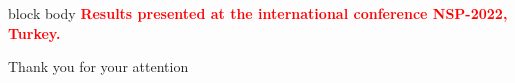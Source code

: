 \documentclass{beamer}
\begin{document}
\begin{frame}
\begin{figure}
	\end{figure}
	\vspace{-0.2cm}
	\begin{beamercolorbox}[rounded=true,shadow=false, wd=\linewidth,]{block body}
		\centering
		\textcolor{red}{\small{\textbf{Results presented at the international conference NSP-2022, Turkey.}}}
	\end{beamercolorbox}
\end{frame}





\begin{frame}[plain] %
	\begin{center}
		\bigskip\bigskip %
		{\Huge Thank you for your attention \faHeart}
	\end{center}
\end{frame}
\end{document}
